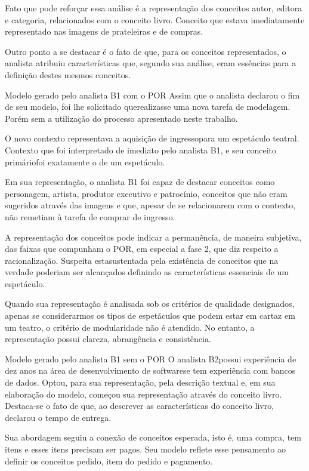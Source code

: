 Fato que pode reforçar essa análise é a representação dos conceitos autor, editora e categoria, relacionados com o conceito livro. Conceito que estava imediatamente representado nas imagens de prateleiras e de compras.

Outro ponto a se destacar é o fato de que, para os conceitos representados, o analista atribuiu características que, segundo sua análise, eram essências para a definição destes mesmos conceitos.


Modelo gerado pelo analista B1 com o POR
Assim que o analista declarou o fim de seu modelo, foi lhe solicitado querealizasse uma nova tarefa de modelagem. Porém sem a utilização do processo apresentado neste trabalho.

O novo contexto representava a aquisição de ingressopara um espetáculo teatral. Contexto que foi interpretado de imediato pelo analista B1, e seu conceito primáriofoi exatamente o de um espetáculo.

Em sua representação, o analista B1 foi capaz de destacar conceitos como personagem, artista, produtor executivo e patrocínio, conceitos que não eram sugeridos através das imagens e que, apesar de se relacionarem com o contexto, não remetiam à tarefa de comprar de ingresso.

A representação dos conceitos pode indicar a permanência, de maneira subjetiva, das faixas que compunham o POR, em especial a fase 2, que diz respeito a racionalização. Suspeita estasustentada pela existência de conceitos que na verdade poderiam ser alcançados definindo as características essenciais de um espetáculo.

Quando sua representação é analisada sob os critérios de qualidade designados, apenas se considerarmos os tipos de espetáculos que podem estar em cartaz em um teatro, o critério de modularidade não é atendido. No entanto, a representação possui clareza, abrangência e consistência.


Modelo gerado pelo analista B1 sem o POR
O analista B2possui experiência de dez anos na área de desenvolvimento de softwarese tem experiência com bancos de dados. Optou, para sua representação, pela descrição textual e, em sua elaboração do modelo, começou sua representação através do conceito livro. Destaca-se o fato de que, ao descrever as características do conceito livro, declarou o tempo de entrega.

Sua abordagem seguiu a conexão de conceitos esperada, isto é, uma compra, tem itens e esses itens precisam ser pagos. Seu modelo reflete esse pensamento ao definir os conceitos pedido, item do pedido e pagamento.

